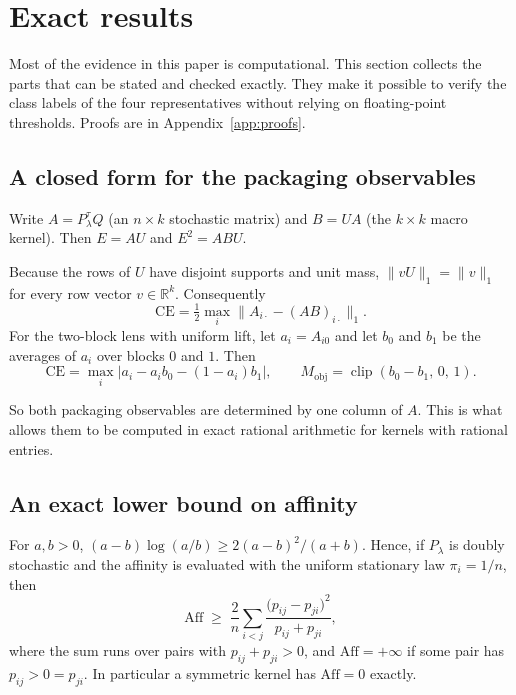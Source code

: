 \section{Exact results}
\label{sec:exact-results}

Most of the evidence in this paper is computational. This section collects the parts that can be stated and checked exactly. They make it possible to verify the class labels of the four representatives without relying on floating-point thresholds. Proofs are in Appendix~\ref{app:proofs}.

\subsection{A closed form for the packaging observables}

Write $A=P_\lambda^{\tau}Q$ (an $n\times k$ stochastic matrix) and $B=UA$ (the $k\times k$ macro kernel). Then $E=AU$ and $E^2=ABU$.

\begin{proposition}
\label{prop:packaging}
Because the rows of $U$ have disjoint supports and unit mass, $\|vU\|_1=\|v\|_1$ for every row vector $v\in\mathbb{R}^k$. Consequently
\[
\mathrm{CE}=\tfrac12\max_i\bigl\|A_{i\cdot}-(AB)_{i\cdot}\bigr\|_1 .
\]
For the two-block lens with uniform lift, let $a_i=A_{i0}$ and let $b_0$ and $b_1$ be the averages of $a_i$ over blocks $0$ and $1$. Then
\[
\mathrm{CE}=\max_i\bigl|a_i-a_ib_0-(1-a_i)b_1\bigr|,\qquad M_{\mathrm{obj}}=\operatorname{clip}(b_0-b_1,\,0,\,1).
\]
\end{proposition}

So both packaging observables are determined by one column of $A$. This is what allows them to be computed in exact rational arithmetic for kernels with rational entries.

\subsection{An exact lower bound on affinity}

\begin{proposition}
\label{prop:reversal}
For $a,b>0$, $(a-b)\log(a/b)\ge 2(a-b)^2/(a+b)$. Hence, if $P_\lambda$ is doubly stochastic and the affinity is evaluated with the uniform stationary law $\pi_i=1/n$, then
\[
\mathrm{Aff}\;\ge\;\frac{2}{n}\sum_{i<j}\frac{\bigl(p_{ij}-p_{ji}\bigr)^2}{p_{ij}+p_{ji}},
\]
where the sum runs over pairs with $p_{ij}+p_{ji}>0$, and $\mathrm{Aff}=+\infty$ if some pair has $p_{ij}>0=p_{ji}$. In particular a symmetric kernel has $\mathrm{Aff}=0$ exactly.
\end{proposition}

